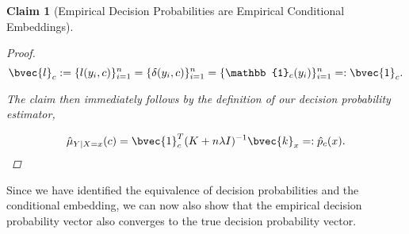 \documentclass{article}
\newtheorem{claim}{Claim}[section]
\begin{document}
\begin{claim}[Empirical Decision Probabilities are Empirical Conditional Embeddings]
\begin{proof}
			\begin{equation}
				\bvec{l}_{c} := \{l(y_{i}, c)\}_{i = 1}^{n} = \{\delta(y_{i}, c)\}_{i = 1}^{n} = \{\mathbb{1}_{c}(y_{i})\}_{i = 1}^{n} =: \bvec{1}_{c}.
			\end{equation}
			
			The claim then immediately follows by the definition of our decision probability estimator,
			
			\begin{equation}
				\hat{\mu}_{Y | X = x}(c) = \bvec{1}_{c}^{T} (K + n \lambda I)^{-1} \bvec{k}_{x} =: \hat{p}_{c}(x).
			\end{equation}
		\end{proof}
		
	\end{claim}
	
	Since we have identified the equivalence of decision probabilities and the conditional embedding, we can now also show that the empirical decision probability vector also converges to the true decision probability vector.
\end{document}
